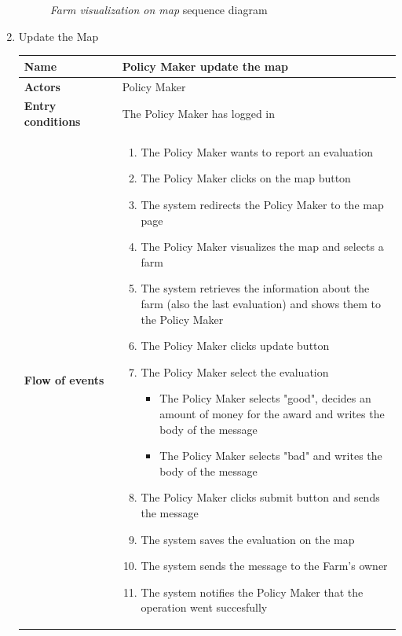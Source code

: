 \begin{enumerate}
\begin{figure}[H]
\begin{center}
        \caption{\emph{Farm visualization on map} sequence diagram}
        \label{fig:sequence11}
        \end{center}
    \end{figure}

    \item Update the Map
    \begin{longtable}{p{0.26\linewidth}p{0.75\linewidth}}
        \toprule
        \textbf{Name} & \textbf{Policy Maker update the map} \\
        \midrule
        \textbf{Actors} & Policy Maker \\
        \midrule
        \textbf{Entry conditions} & The Policy Maker has logged in\\
        \midrule
        \textbf{Flow of events} & 
        \begin{enumerate}
            \item The Policy Maker wants to report an evaluation
            \item The Policy Maker clicks on the map button
            \item The system redirects the Policy Maker to the map page
            \item The Policy Maker visualizes the map and selects a farm
            \item The system retrieves the information about the farm (also the last evaluation) and shows them to the Policy Maker
            \item The Policy Maker clicks update button
            \item The Policy Maker select the evaluation
                \begin{itemize}
                    \item The Policy Maker selects "good", decides an amount of money for the award and writes the body of the message
                    \item The Policy Maker selects "bad" and writes the body of the message
                \end{itemize}
            \item The Policy Maker clicks submit button and sends the message
            \item The system saves the evaluation on the map
            \item The system sends the message to the Farm's owner
            \item The system notifies the Policy Maker that the operation went succesfully 
        \end{enumerate} \\

\end{longtable}
\end{enumerate}
